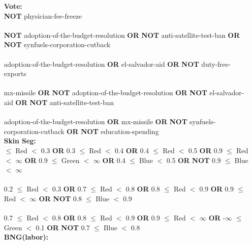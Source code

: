 \noindent \textbf{ Vote: }\\

\noindent  \textbf{NOT} physician-fee-freeze \\\\ \textbf{NOT} adoption-of-the-budget-resolution \textbf{OR}  \textbf{NOT} anti-satellite-test-ban \textbf{OR}  \textbf{NOT} synfuels-corporation-cutback \\\\adoption-of-the-budget-resolution \textbf{OR} el-salvador-aid \textbf{OR}  \textbf{NOT} duty-free-exports \\\\mx-missile \textbf{OR}  \textbf{NOT} adoption-of-the-budget-resolution \textbf{OR}  \textbf{NOT} el-salvador-aid \textbf{OR}  \textbf{NOT} anti-satellite-test-ban \\\\adoption-of-the-budget-resolution \textbf{OR} mx-missile \textbf{OR}  \textbf{NOT} synfuels-corporation-cutback \textbf{OR}  \textbf{NOT} education-spending \\

\noindent \textbf{ Skin Seg: }\\

 $\le$ Red $<$ 0.3 \textbf{OR} 0.3 $\le$ Red $<$ 0.4 \textbf{OR} 0.4 $\le$ Red $<$ 0.5 \textbf{OR} 0.9 $\le$ Red $<$ $\infty$ \textbf{OR} 0.9 $\le$ Green $<$ $\infty$ \textbf{OR} 0.4 $\le$ Blue $<$ 0.5 \textbf{OR}  \textbf{NOT} 0.9 $\le$ Blue $<$ $\infty$ \\\\0.2 $\le$ Red $<$ 0.3 \textbf{OR} 0.7 $\le$ Red $<$ 0.8 \textbf{OR} 0.8 $\le$ Red $<$ 0.9 \textbf{OR} 0.9 $\le$ Red $<$ $\infty$ \textbf{OR}  \textbf{NOT} 0.8 $\le$ Blue $<$ 0.9 \\\\0.7 $\le$ Red $<$ 0.8 \textbf{OR} 0.8 $\le$ Red $<$ 0.9 \textbf{OR} 0.9 $\le$ Red $<$ $\infty$ \textbf{OR} -$\infty$ $\le$ Green $<$ 0.1 \textbf{OR}  \textbf{NOT} 0.7 $\le$ Blue $<$ 0.8 \\

\noindent \textbf{ BNG(labor): }\\

